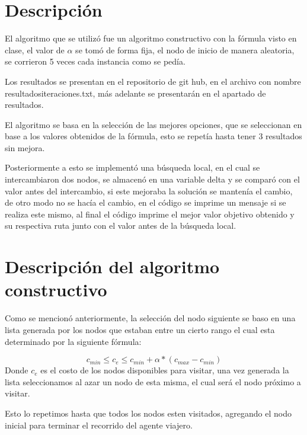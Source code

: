 \documentclass[12pt,a4paper]{article}
\begin{document}
\section{Descripción}
 El algoritmo que se utilizó fue un algoritmo constructivo con la fórmula visto en clase, el valor de $\alpha$ se tomó de forma fija, el nodo de inicio de manera aleatoria, se corrieron 5 veces cada instancia como se pedía.
 
 Los resultados se presentan en el repositorio de git hub, en el archivo con nombre resultadositeraciones.txt, más adelante se presentarán en el apartado de resultados.
 
 El algoritmo se basa en la selección de las mejores opciones, que se seleccionan en base a los valores obtenidos de la fórmula, esto se repetía hasta tener 3 resultados sin mejora.

 Posteriormente a esto se implementó una búsqueda local, en el cual se intercambiaron dos nodos, se almacenó en una variable delta y se comparó con el valor antes del intercambio, si este mejoraba la solución se mantenía el cambio, de otro modo no se hacía el cambio, en el código
 se imprime un mensaje si se realiza este mismo, al final el código imprime el mejor valor objetivo obtenido y su respectiva ruta junto con el valor antes de la búsqueda local.
 
 \section{Descripción del algoritmo constructivo}

 Como se mencionó anteriormente, la selección del nodo siguiente se baso en una lista generada por los nodos que estaban entre un cierto rango el cual esta determinado por la siguiente fórmula:

 \[ c_{min} \leq c_e \leq c_{min} + \alpha * (c_{max} - c_{min}) \]
\newline
 Donde $c_e$ es el costo de los nodos disponibles para visitar, una vez generada la lista seleccionamos al azar un nodo de esta misma, el cual será el nodo próximo a visitar.

 Esto lo repetimos hasta que todos los nodos esten visitados, agregando el nodo inicial para terminar el recorrido del agente viajero.
\end{document}
